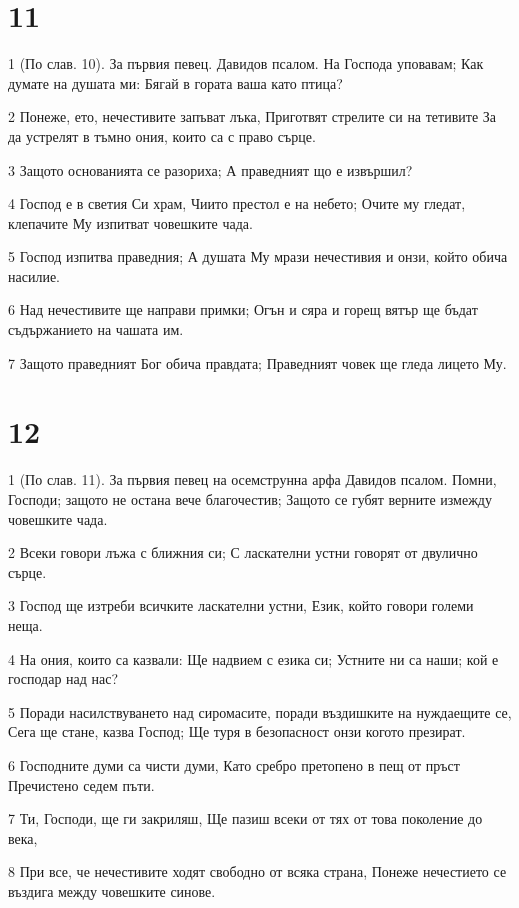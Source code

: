 \chapter{11}

\par 1 (По слав. 10). За първия певец. Давидов псалом. На Господа уповавам; Как думате на душата ми: Бягай в гората ваша като птица?
\par 2 Понеже, ето, нечестивите запъват лъка, Приготвят стрелите си на тетивите За да устрелят в тъмно ония, които са с право сърце.
\par 3 Защото основанията се разориха; А праведният що е извършил?
\par 4 Господ е в светия Си храм, Чиито престол е на небето; Очите му гледат, клепачите Му изпитват човешките чада.
\par 5 Господ изпитва праведния; А душата Му мрази нечестивия и онзи, който обича насилие.
\par 6 Над нечестивите ще направи примки; Огън и сяра и горещ вятър ще бъдат съдържанието на чашата им.
\par 7 Защото праведният Бог обича правдата; Праведният човек ще гледа лицето Му.

\chapter{12}

\par 1 (По слав. 11). За първия певец на осемструнна арфа Давидов псалом. Помни, Господи; защото не остана вече благочестив; Защото се губят верните измежду човешките чада.
\par 2 Всеки говори лъжа с ближния си; С ласкателни устни говорят от двулично сърце.
\par 3 Господ ще изтреби всичките ласкателни устни, Език, който говори големи неща.
\par 4 На ония, които са казвали: Ще надвием с езика си; Устните ни са наши; кой е господар над нас?
\par 5 Поради насилствуването над сиромасите, поради въздишките на нуждаещите се, Сега ще стане, казва Господ; Ще туря в безопасност онзи когото презират.
\par 6 Господните думи са чисти думи, Като сребро претопено в пещ от пръст Пречистено седем пъти.
\par 7 Ти, Господи, ще ги закриляш, Ще пазиш всеки от тях от това поколение до века,
\par 8 При все, че нечестивите ходят свободно от всяка страна, Понеже нечестието се въздига между човешките синове.

